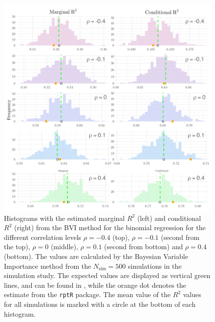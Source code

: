 \begin{figure}[H]
  \centering
  \includegraphics[width=1.1\linewidth]{Figures/Simulation study/R2_combined_logit.png}
  \caption{Histograms with the estimated marginal $R^2$ (left) and conditional $R^2$ (right) from the BVI method for the binomial regression for the different correlation levels $\rho=-0.4$ (top), $\rho=-0.1$ (second from the top), $\rho=0$ (middle), $\rho=0.1$ (second from bottom) and $\rho=0.4$ (bottom). The values are calculated by the Bayesian Variable Importance method from the $N_{\text{sim}}=500$ simulations in the simulation study. The expected values are displayed as vertical green lines, and can be found in , while the orange dot denotes the estimate from the \texttt{rptR} package. The mean value of the $R^2$ values for all simulations is marked with a circle at the bottom of each histogram.}
  \label{fig:r2_combined_logit}
\end{figure}






